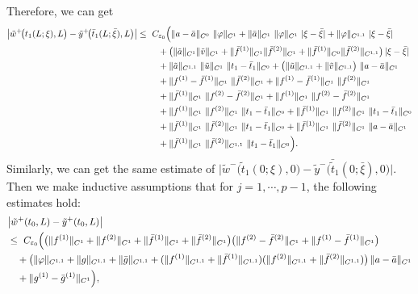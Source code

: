 \documentclass[a4paper,reqno,11pt]{amsart}
\numberwithin{equation}{section} %
\begin{document}
Therefore, we can get
\[
\begin{aligned}
\bigl|\tilde w^+\!\bigl(t_1(L;\xi),L\bigr)-\tilde y ^+\!\bigl(\bar t_1(L;\bar\xi),L\bigr)\bigr|
\le{}&\ C_{\varepsilon_0}\Bigl(
  \|a-\bar a\|_{C^{0}}\ \|\varphi\|_{C^{1}}
  + \|\bar a\|_{C^{1}}\ \|\varphi\|_{C^{1}}\ |\xi-\bar\xi|
  + \|\varphi\|_{C^{1,1}}\ |\xi-\bar\xi|
\\
&\quad
  + \bigl(\|\tilde a\|_{C^{1}}\|\tilde v\|_{C^{1}}
     + \|\bar f^{(1)}\|_{C^{1}}\|\bar f^{(2)}\|_{C^{1}}
     + \|\bar f^{(1)}\|_{C^{0}}\|\bar f^{(2)}\|_{C^{1,1}}\bigr)\,|\xi-\bar\xi|
\\
&\quad
  + \|\tilde a\|_{C^{1,1}}\ \|\tilde u\|_{C^{1}}\ \|t_1-\bar t_1\|_{C^{0}}
  + \bigl(\|\tilde u\|_{C^{1,1}}+\|\tilde v\|_{C^{1,1}}\bigr)\ \|a-\bar a\|_{C^{1}}
\\
&\quad
  + \|f^{(1)}-\bar f^{(1)}\|_{C^{1}}\ \|\bar f^{(2)}\|_{C^{1}}
  + \|f^{(1)}-\bar f^{(1)}\|_{C^{1}}\ \|f^{(2)}\|_{C^{1}}
\\
&\quad
  + \|\bar f^{(1)}\|_{C^{1}}\ \|f^{(2)}-\bar f^{(2)}\|_{C^{1}}
  + \|f^{(1)}\|_{C^{1}}\ \|f^{(2)}-\bar f^{(2)}\|_{C^{1}}
\\
&\quad
  + \|f^{(1)}\|_{C^{1}}\ \|f^{(2)}\|_{C^{1}}\ \|t_1-\bar t_1\|_{C^{0}}
  + \|\bar f^{(1)}\|_{C^{1}}\ \|f^{(2)}\|_{C^{1}}\ \|t_1-\bar t_1\|_{C^{0}}
\\
&\quad
  + \|\bar f^{(1)}\|_{C^{1}}\ \|\bar f^{(2)}\|_{C^{1}}\ \|t_1-\bar t_1\|_{C^{0}}
  + \|\bar f^{(1)}\|_{C^{1}}\ \|\bar f^{(2)}\|_{C^{1}}\ \|a-\bar a\|_{C^{1}}
\\
&\quad
  + \|\bar f^{(1)}\|_{C^{1}}\ \|\bar f^{(2)}\|_{C^{1,1}}\ \|t_1-\bar t_1\|_{C^{0}}
\Bigr).
\end{aligned}
\]
Similarly, we can get the same estimate of $\bigl|\tilde w^-\bigl(\tilde t_1(0;\xi),0\bigr)-\tilde y ^-\bigl(\bar{\tilde{t}}_1(0;\bar\xi),0\bigr)\bigr|$.
Then we make inductive assumptions that for $j=1,\cdots,p-1$, the following estimates hold:
\[
\begin{aligned}
&\bigl|\tilde w^+(t_0,L)-\tilde y ^+(t_0,L)\bigr|\\
&\le{}\ C_{\varepsilon_0}\Bigl(
  \bigl(\|f^{(1)}\|_{C^{1}}+\|f^{(2)}\|_{C^{1}}
       +\|\bar f^{(1)}\|_{C^{1}}+\|\bar f^{(2)}\|_{C^{1}}\bigr)
  \bigl(\|f^{(2)}-\bar f^{(2)}\|_{C^{1}}
       +\|f^{(1)}-\bar f^{(1)}\|_{C^{1}}\bigr)
\\
&\quad
  + \bigl(\|\varphi\|_{C^{1,1}}+\|g\|_{C^{1,1}}+\|\bar g\|_{C^{1,1}}
     + (\|f^{(1)}\|_{C^{1,1}}+\|\bar f^{(1)}\|_{C^{1,1}})
       (\|f^{(2)}\|_{C^{1,1}}+\|\bar f^{(2)}\|_{C^{1,1}})\bigr)
       \,\|a-\bar a\|_{C^{1}}
\\
&\quad
  + \|g^{(1)}-\bar g^{(1)}\|_{C^{1}}
\Bigr),
\end{aligned}
\]
\end{document}
